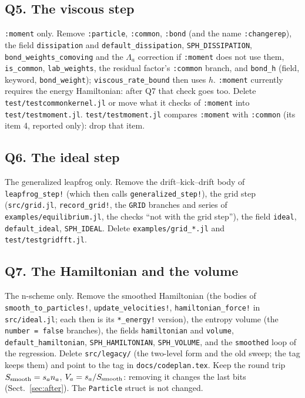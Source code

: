 \documentclass[11pt,aps,preprint,nofootinbib,superscriptaddress,tightenlines]{revtex4-2}
\def\Sect#1{Sect.~\ref{#1}}
\begin{document}
\subsection*{Q5. The viscous step}
\texttt{:moment} only.  Remove \texttt{:particle}, \texttt{:common}, \texttt{:bond} (and the name \texttt{:changerep}), the field
\texttt{dissipation} and \texttt{default\_dissipation}, \texttt{SPH\_DISSIPATION}, \texttt{bond\_weights\_comoving} and the $\Lambda_a$
correction if \texttt{:moment} does not use them, \texttt{is\_common}, \texttt{lab\_weights}, the residual factor's \texttt{:common} branch, and
\texttt{bond\_h} (field, keyword, \texttt{bond\_weight}); \texttt{viscous\_rate\_bound} then uses $h$.  \texttt{:moment} currently requires the
energy Hamiltonian: after Q7 that check goes too.  Delete \nolinkurl{test/testcommonkernel.jl} or move what it checks of \texttt{:moment} into
\nolinkurl{test/testmoment.jl}.  \nolinkurl{test/testmoment.jl} compares \texttt{:moment} with \texttt{:common} (its item 4, reported only): drop
that item.

\subsection*{Q6. The ideal step}
The generalized leapfrog only.  Remove the drift--kick--drift body of \texttt{leapfrog\_step!} (which then calls \texttt{generalized\_step!}), the
grid step (\nolinkurl{src/grid.jl}, \texttt{record\_grid!}, the \texttt{GRID} branches and series of \nolinkurl{examples/equilibrium.jl}, the
checks ``not with the grid step''), the field \texttt{ideal}, \texttt{default\_ideal}, \texttt{SPH\_IDEAL}.  Delete \nolinkurl{examples/grid_*.jl}
and \nolinkurl{test/testgridfft.jl}.

\subsection*{Q7. The Hamiltonian and the volume}
The n-scheme only.  Remove the smoothed Hamiltonian (the bodies of \texttt{smooth\_to\_particles!}, \texttt{update\_velocities!},
\texttt{hamiltonian\_force!} in \nolinkurl{src/ideal.jl}; each then is its \texttt{*\_energy!} version), the entropy volume (the
\texttt{number = false} branches), the fields \texttt{hamiltonian} and \texttt{volume}, \texttt{default\_hamiltonian}, \texttt{SPH\_HAMILTONIAN},
\texttt{SPH\_VOLUME}, and the \texttt{smoothed} loop of the regression.  Delete \nolinkurl{src/legacy/} (the two-level form and the old sweep;
the tag keeps them) and point to the tag in \nolinkurl{docs/codeplan.tex}.  Keep the round trip $S_{\rm smooth}=s_a n_a$, $V_a=s_a/S_{\rm
smooth}$: removing it changes the last bits (\Sect{sec:after}).  The \texttt{Particle} struct is not changed.
\end{document}
